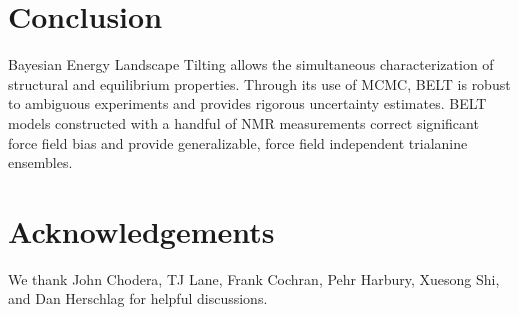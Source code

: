 \documentclass[11pt,titlepage]{article}
\begin{document}
\section*{Conclusion}

Bayesian Energy Landscape Tilting allows the simultaneous characterization of structural and equilibrium properties.  Through its use of MCMC, BELT is robust to ambiguous experiments and provides rigorous uncertainty estimates.  BELT models constructed with a handful of NMR measurements correct significant force field bias and provide generalizable, force field independent trialanine ensembles.  


\section*{Acknowledgements}

We thank John Chodera, TJ Lane, Frank Cochran, Pehr Harbury, Xuesong Shi, and Dan Herschlag for helpful discussions.  


\end{document}
